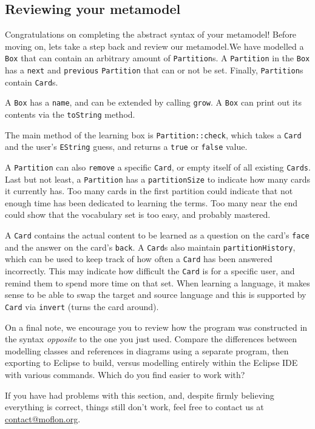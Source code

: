 \newpage 
\genHeader
\subsection{Reviewing your metamodel}
\hypertarget{static review}{}

Congratulations on completing the abstract syntax of your metamodel!
Before moving on, lets take a step back and review our metamodel.We have modelled a \texttt{Box} that can contain an arbitrary amount of \texttt{Partition}s. A
\texttt{Partition} in the \texttt{Box} has a \texttt{next} and \texttt{previous} \texttt{Partition} that can or not be set. Finally, \texttt{Partition}s contain \texttt{Card}s.

A \texttt{Box} has a \texttt{name}, and can be extended by calling \texttt{grow}. A \texttt{Box} can print out its contents via the \texttt{toString} method.

The main method of the learning box is \texttt{Partition::check}, which takes a \texttt{Card} and the user's \texttt{EString} guess, and returns a \texttt{true}
or \texttt{false} value.

A \texttt{Partition} can also \texttt{remove} a specific \texttt{Card}, or empty itself of all  existing \texttt{Cards}. Last but not least, a
\texttt{Partition} has a \texttt{partitionSize} to indicate how many cards it currently has. Too many cards in the first partition could indicate that not
enough time has been dedicated to learning the terms. Too many near the end could show that the vocabulary set is too easy, and probably mastered.

A \texttt{Card} contains the actual content to be learned as a question on the card's \texttt{face} and the answer on the card's \texttt{back}. A \texttt{Card}s
also maintain \texttt{partition\-History}, which can be used to keep track of how often a \texttt{Card} has been answered incorrectly.
This may indicate how difficult the \texttt{Card} is for a specific user, and remind them to spend more time on that set. When learning a language, it makes
sense to be able to swap the target and source language and this is supported by \texttt{Card} via \texttt{invert} (turns the card around).

On a final note, we encourage you to review how the program was constructed in the syntax \emph{opposite} to the one you just used. Compare the differences
between modelling classes and references in diagrams using a separate program, then exporting to Eclipse to build, versus modelling entirely within the Eclipse
IDE with various commands. Which do you find easier to work with?

If you have had problems with this section, and, despite firmly believing everything is correct, things still don't work, feel free to contact us at
\href{mailto:contact@moflon.org}{contact@moflon.org}.

